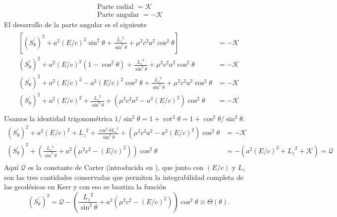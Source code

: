 $$
    \begin{array}{c}
        \text { Parte radial }=\mathcal{K} \\
        \text { Parte angular }=-\mathcal{K}
    \end{array}
$$
El desarrollo de la parte angular es el siguiente
\begin{align}
    \begin{aligned}
        \left[\left(S_\theta^{\prime}\right)^2+a^2 (E/c)^2 \sin ^2 \theta+\frac{{L_z}^2}{\sin ^2 \theta}+\mu^2 c^2 a^2 \cos ^2 \theta\right] & = -\mathcal{K} \\
        \left(S_\theta^{\prime}\right)^2+a^2 (E/c)^2 (1- \cos^2 \theta)+\frac{{L_z}^2}{\sin ^2 \theta}+\mu^2 c^2 a^2 \cos ^2 \theta          & = -\mathcal{K} \\
        \left(S_\theta^{\prime}\right)^2+a^2 (E/c)^2 - a^2 (E/c)^2 \cos^2 \theta+\frac{{L_z}^2}{\sin ^2 \theta}+\mu^2 c^2 a^2 \cos ^2 \theta     & = -\mathcal{K} \\
        \left(S_\theta^{\prime}\right)^2+a^2 (E/c)^2+\frac{{L_z}^2}{\sin ^2 \theta}+(\mu^2 c^2 a^2 - a^2 (E/c)^2) \cos ^2 \theta                 & = -\mathcal{K} \\
    \end{aligned}
\end{align}
Usamos la identidad trigonométrica $1 / \sin ^2 \theta=1+\cot ^2 \theta=1+\cos ^2 \theta / \sin ^2 \theta$.
\begin{equation}
    \begin{aligned}
        \left(S_\theta^{\prime}\right)^2+a^2 (E/c)^2+{L_z}^2+\frac{\cos^2 \theta {L_z}^2}{\sin ^2 \theta}+(\mu^2 c^2 a^2 - a^2 (E/c)^2) \cos ^2 \theta & = -\mathcal{K}                            \\
        \left(S_\theta^{\prime}\right)^2+\left(\frac{ {L_z}^2}{\sin ^2 \theta}+a^2(\mu^2 c^2  -  (E/c)^2) \right)\cos ^2 \theta                & = -(a^2 (E/c)^2+{L_z}^2+\mathcal{K}) =\mathcal{Q} \\
    \end{aligned}
\end{equation}
Aquí $\mathcal{Q}$ es la constante de Carter (introducida en \cite{carter-1968}), que junto con $(E/c)$ y ${L_z}$ son las tres cantidades conservadas que permiten la integrabilidad completa de las geodésicas en Kerr y con eso se bautiza la función
\begin{equation}
    \left(S_\theta^{\prime}\right)^2=\mathcal{Q}-\left(\frac{{L_z}^2}{\sin ^2 \theta}+a^2\left(\mu^2 c^2-(E/c)^2\right)\right) \cos ^2 \theta \equiv \Theta(\theta) .
\end{equation}

